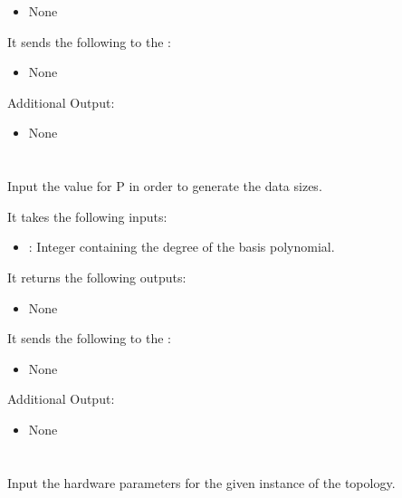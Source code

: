 \begin{itemize}
\item None
\end{itemize}

It sends the following to the :

\begin{itemize}
\item None
\end{itemize}

Additional Output:
\begin{itemize}
\item None
\end{itemize}


\section{}
Input the value for P in order to generate the data sizes.

It takes the following inputs:

\begin{itemize}
\item {}: Integer containing the degree of the basis polynomial.
\end{itemize}

It returns the following outputs:

\begin{itemize}
\item None
\end{itemize}

It sends the following to the :

\begin{itemize}
\item None
\end{itemize}

Additional Output:
\begin{itemize}
\item None
\end{itemize}

\section{}
Input the hardware parameters for the given instance of the topology.

